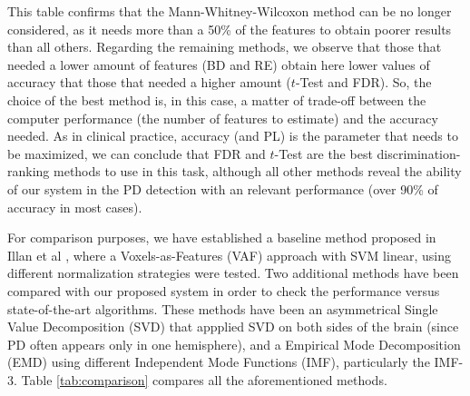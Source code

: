 This table confirms that the Mann-Whitney-Wilcoxon method can be no longer considered, as it needs more than a 50\% of the features to obtain poorer results than all others. Regarding the remaining methods, we observe that those that needed a lower amount of features (BD and RE) obtain here lower values of accuracy that those that needed a higher amount ($t$-Test and FDR). So, the choice of the best method is, in this case, a matter of trade-off between the computer performance (the number of features to estimate) and the accuracy needed. As in clinical practice, accuracy (and PL) is the parameter that needs to be maximized, we can conclude that FDR and $t$-Test are the best discrimination-ranking methods to use in this task, although all other methods reveal the ability of our system in the PD detection with an relevant performance (over 90\% of accuracy in most cases). 

For comparison purposes, we have established a baseline method proposed in Illan et al \cite{Illan2012}, where a Voxels-as-Features (VAF) approach with SVM linear, using different normalization strategies were tested. Two additional methods have been compared with our proposed system in order to check the performance versus state-of-the-art algorithms. These methods have been an asymmetrical Single Value Decomposition (SVD) \cite{Segovia2012} that appplied SVD on both sides of the brain (since PD often appears only in one hemisphere), and a Empirical Mode Decomposition (EMD)  \cite{Rojas2012} using different Independent Mode Functions (IMF), particularly the IMF-3. Table \ref{tab:comparison} compares all the aforementioned methods. 

